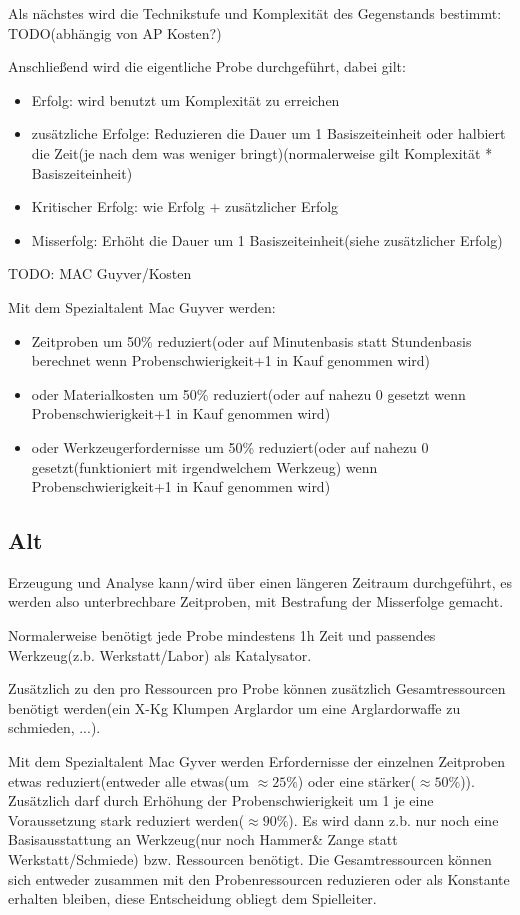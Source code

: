 Als nächstes wird die Technikstufe und Komplexität des Gegenstands bestimmt: TODO(abhängig von AP Kosten?)

Anschließend wird die eigentliche Probe durchgeführt, dabei gilt:
\begin{itemize}
\item Erfolg: wird benutzt um Komplexität zu erreichen
\item zusätzliche Erfolge: Reduzieren die Dauer um 1 Basiszeiteinheit oder halbiert die Zeit(je nach dem was weniger bringt)(normalerweise gilt Komplexität * Basiszeiteinheit)
\item Kritischer Erfolg: wie Erfolg + zusätzlicher Erfolg
\item Misserfolg: Erhöht die Dauer um 1 Basiszeiteinheit(siehe zusätzlicher Erfolg)
\end{itemize}

TODO: MAC Guyver/Kosten

Mit dem Spezialtalent Mac Guyver werden:
\begin{itemize}
\item Zeitproben um 50\% reduziert(oder auf Minutenbasis statt Stundenbasis berechnet wenn Probenschwierigkeit+1 in Kauf genommen wird)
\item oder Materialkosten um 50\% reduziert(oder auf nahezu 0 gesetzt wenn Probenschwierigkeit+1 in Kauf genommen wird)
\item oder Werkzeugerfordernisse um 50\% reduziert(oder auf nahezu 0 gesetzt(funktioniert mit irgendwelchem Werkzeug) wenn Probenschwierigkeit+1 in Kauf genommen wird)
\end{itemize}

\subsection{Alt}
Erzeugung und Analyse kann/wird über einen längeren Zeitraum durchgeführt, es werden also unterbrechbare Zeitproben, mit Bestrafung der Misserfolge gemacht.

Normalerweise benötigt jede Probe mindestens 1h Zeit und passendes Werkzeug(z.b. Werkstatt/Labor) als Katalysator.

Zusätzlich zu den pro Ressourcen pro Probe können zusätzlich Gesamtressourcen benötigt werden(ein X-Kg Klumpen Arglardor um eine Arglardorwaffe zu schmieden, ...).

Mit dem Spezialtalent Mac Gyver werden Erfordernisse der einzelnen Zeitproben etwas reduziert(entweder alle etwas(um $\approx25\%$) oder eine stärker($\approx50\%$)). 
Zusätzlich darf durch Erhöhung der Probenschwierigkeit um 1 je eine Voraussetzung stark reduziert werden($\approx90\%$).
Es wird dann z.b. nur noch eine Basisausstattung an Werkzeug(nur noch Hammer\& Zange statt Werkstatt/Schmiede) bzw. Ressourcen benötigt.
Die Gesamtressourcen können sich entweder zusammen mit den Probenressourcen reduzieren oder als Konstante erhalten bleiben, diese Entscheidung obliegt dem Spielleiter.


